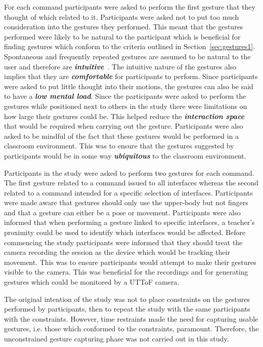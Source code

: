\documentclass[manuscript, review, screen]{acmart}
\begin{document}
For each command participants were asked to perform the first gesture that they thought of which related to it.
Participants were asked not to put too much consideration into the gestures they performed.
This meant that the gestures performed were likely to be natural to the participant which is beneficial for finding gestures which conform to the criteria outlined in Section~\ref{sec:gestures1}.
Spontaneous and frequently repeated gestures are assumed to be natural to the user and therefore are \textit{\textbf{intuitive}}~\cite{Grandhi2011}.
The intuitive nature of the gestures also implies that they are \textit{\textbf{comfortable}} for participants to perform.
Since participants were asked to put little thought into their motions, the gestures can also be said to have a \textit{\textbf{low mental load}}.
Since the participants were asked to perform the gestures while positioned next to others in the study there were limitations on how large their gestures could be.
This helped reduce the \textit{\textbf{interaction space}} that would be required when carrying out the gesture.
Participants were also asked to be mindful of the fact that these gestures would be performed in a classroom environment.
This was to ensure that the gestures suggested by participants would be in some way \textit{\textbf{ubiquitous}} to the classroom environment.

Participants in the study were asked to perform two gestures for each command.
The first gesture related to a command issued to all interfaces whereas the second related to a command intended for a specific selection of interfaces.
Participants were made aware that gestures should only use the upper-body but not fingers and that a gesture can either be a pose or movement.
Participants were also informed that when performing a gesture linked to specific interfaces, a teacher's proximity could be used to identify which interfaces would be affected.
Before commencing the study participants were informed that they should treat the camera recording the session as the device which would be tracking their movement.
This was to ensure participants would attempt to make their gestures visible to the camera.
This was beneficial for the recordings and for generating gestures which could be monitored by a \ac{UTToF} camera.

The original intention of the study was not to place constraints on the gestures performed by participants, then to repeat the study with the same participants with the constraints.
However, time restraints made the need for capturing usable gestures, i.e. those which conformed to the constraints, paramount.
Therefore, the unconstrained gesture capturing phase was not carried out in this study.
\end{document}
